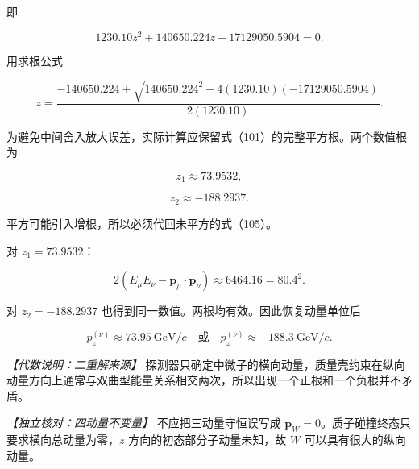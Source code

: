 \documentclass[12pt,a4paper,UTF8]{ctexart}
\begin{document}
即

\[1230.10z^2+140650.224z-17129050.5904=0. \tag{107a}\]

用求根公式

\[z=\frac{-140650.224\pm
\sqrt{140650.224^2-4(1230.10)(-17129050.5904)}}{2(1230.10)}. \tag{107b}\]

为避免中间舍入放大误差，实际计算应保留式（101）的完整平方根。两个数值根为

\[z_1\approx73.9532,\]

\[z_2\approx-188.2937. \tag{108}\]

平方可能引入增根，所以必须代回未平方的式（105）。

对 \(z_1=73.9532\)：

\[2(E_\mu E_\nu-\bm p_\mu\cdot\bm p_\nu)
\approx6464.16=80.4^2.\]

对 \(z_2=-188.2937\) 也得到同一数值。两根均有效。因此恢复动量单位后

\[\boxed{
p_z^{(\nu)}\approx73.95\ \mathrm{GeV}/c
\quad\text{或}\quad
p_z^{(\nu)}\approx-188.3\ \mathrm{GeV}/c
}. \tag{109}\]

\emph{【代数说明：二重解来源】}
探测器只确定中微子的横向动量，质量壳约束在纵向动量方向上通常与双曲型能量关系相交两次，所以出现一个正根和一个负根并不矛盾。

\emph{【独立核对：四动量不变量】} 不应把三动量守恒误写成
\(\bm p_W=0\)。质子碰撞终态只要求横向总动量为零，\(z\)
方向的初态部分子动量未知，故 \(W\) 可以具有很大的纵向动量。
\end{document}
